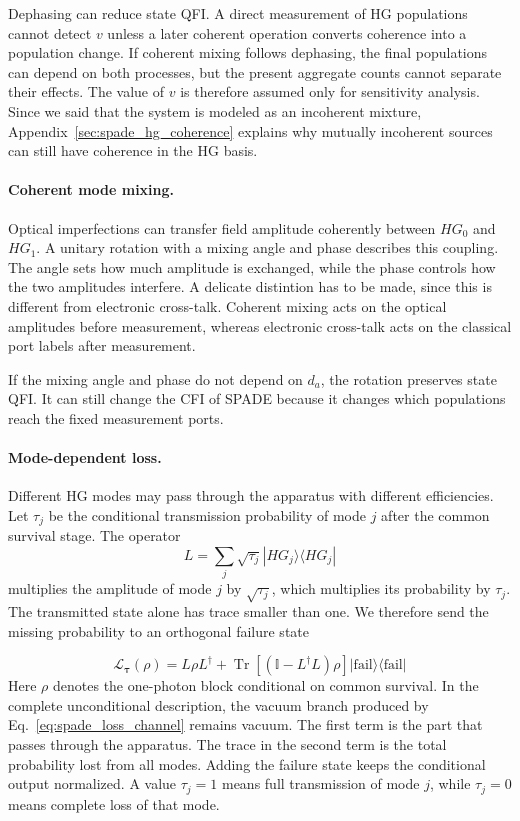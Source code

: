 Dephasing can reduce state QFI.  A direct measurement of HG populations cannot detect $v$ unless a later coherent operation converts coherence into a population change.  If coherent mixing follows dephasing, the final populations can depend on both processes, but the present aggregate counts cannot separate their effects.  The value of $v$ is therefore assumed only for sensitivity analysis.
Since we said that the system is modeled as an incoherent mixture, Appendix~\ref{sec:spade_hg_coherence} explains why mutually incoherent sources can still have coherence in the HG basis.

\paragraph{Coherent mode mixing.}
Optical imperfections can transfer field amplitude coherently between $HG_0$ and $HG_1$.  A unitary rotation with a mixing angle and phase describes this coupling.  The angle sets how much amplitude is exchanged, while the phase controls how the two amplitudes interfere.  A delicate distintion has to be made, since this is different from electronic cross-talk.  Coherent mixing acts on the optical amplitudes before measurement, whereas electronic cross-talk acts on the classical port labels after measurement.

If the mixing angle and phase do not depend on $d_a$, the rotation preserves state QFI.  It can still change the CFI of SPADE because it changes which populations reach the fixed measurement ports.

\paragraph{Mode-dependent loss.}
Different HG modes may pass through the apparatus with different efficiencies.  Let $\tau_j$ be the conditional transmission probability of mode $j$ after the common survival stage.  The operator
\begin{equation}
    L=\sum_j\sqrt{\tau_j}|HG_j\rangle\langle HG_j|
\end{equation}
multiplies the amplitude of mode $j$ by $\sqrt{\tau_j}$, which multiplies its probability by $\tau_j$.  The transmitted state alone has trace smaller than one.  We therefore send the missing probability to an orthogonal failure state

\begin{equation}
    \mathcal{L}_{\boldsymbol\tau}(\rho)
    =L\rho L^{\dagger}
    +\operatorname{Tr}\!\left[(\mathbb{I}-L^{\dagger}L)\rho\right]
    |\mathrm{fail}\rangle\langle\mathrm{fail}|
    \label{eq:spade_modal_loss}
\end{equation}
Here $\rho$ denotes the one-photon block conditional on common survival. In the complete unconditional description, the vacuum branch produced by Eq.~\eqref{eq:spade_loss_channel} remains vacuum. The first term is the part that passes through the apparatus.  The trace in the second term is the total probability lost from all modes.  Adding the failure state keeps the conditional output normalized.  A value $\tau_j=1$ means full transmission of mode $j$, while $\tau_j=0$ means complete loss of that mode.

